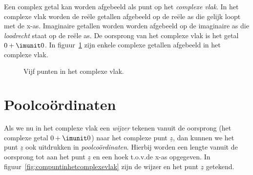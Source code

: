 %
%
%

Een complex getal kan worden afgebeeld als punt op het \textsl{complexe vlak}. In het complexe vlak worden de reële getallen afgebeeld op de reële as die gelijk loopt met de x-as. Imaginaire getallen worden worden afgebeeld op de imaginaire as die \textsl{loodrecht} staat op de reële as. De oorsprong van het complexe vlak is het getal $0+\imunit0$. In figuur~\ref{fig:comvierpunten} zijn enkele complexe getallen afgebeeld in het complexe vlak.

\begin{figure}[H]
\centering
{}
\caption{Vijf punten in het complexe vlak.}
\label{fig:comvierpunten}
\end{figure}


\section{Poolcoördinaten}

Als we nu in het complexe vlak een \textsl{wijzer} tekenen vanuit de oorsprong (het complexe getal $0+\imunit0$) naar het complexe punt $\underline{z}$, dan kunnen we het punt $\underline{z}$ ook uitdrukken in \textsl{poolcoördinaten}. Hierbij worden een lengte vanuit de oorsprong tot aan het punt $\underline{z}$ en een hoek t.o.v.\@ de x-as opgegeven. In figuur~\ref{fig:compuntinhetcomplexevlak} zijn de wijzer en het punt $\underline{z}$ getekend.


